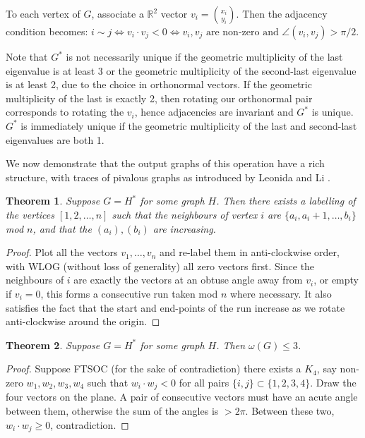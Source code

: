 \documentclass[11pt]{article}
\newtheorem{thm}{Theorem}[section]
\begin{document}
To each vertex of $G$, associate a $\mathbb{R}^2$ vector $v_i = \binom{x_i}{y_i}$. Then the adjacency condition becomes: $i \sim j \iff v_i \cdot v_j < 0 \iff v_i, v_j \text{ are non-zero and } \angle (v_i, v_j) > \pi/2$.

Note that $G^*$ is not necessarily unique if the geometric multiplicity of the last eigenvalue is at least 3 or the geometric multiplicity of the second-last eigenvalue is at least 2, due to the choice in orthonormal vectors. If the geometric multiplicity of the last is exactly 2, then rotating our orthonormal pair corresponds to rotating the $v_i$, hence adjacencies are invariant and $G^*$ is unique. $G^*$ is immediately unique if the geometric multiplicity of the last and second-last eigenvalues are both 1. 

We now demonstrate that the output graphs of this operation have a rich structure, with traces of pivalous graphs as introduced by Leonida and Li \cite{leonida2024structure}. 

\begin{thm}\label{thm:operation-run}
    Suppose $G = H^*$ for some graph $H$. Then there exists a labelling of the vertices $[1, 2, \dots, n]$ such that the neighbours of vertex $i$ are $\{a_i, a_i+1, \dots, b_i\}$ mod $n$, and that the $(a_i), (b_i)$ are increasing. 
\end{thm}
\begin{proof}    
    Plot all the vectors $v_1, \dots, v_n$ and re-label them in anti-clockwise order, with WLOG (without loss of generality) all zero vectors first. Since the neighbours of $i$ are exactly the vectors at an obtuse angle away from $v_i$, or empty if $v_i = 0$, this forms a consecutive run taken mod $n$ where necessary. It also satisfies the fact that the start and end-points of the run increase as we rotate anti-clockwise around the origin.
\end{proof}

\begin{thm}\label{thm:operation-clique}
    Suppose $G = H^*$ for some graph $H$. Then $\omega(G) \le 3$. 
\end{thm}
\begin{proof}
    Suppose FTSOC (for the sake of contradiction) there exists a $K_4$, say non-zero $w_1, w_2, w_3, w_4$ such that $w_i \cdot w_j < 0$ for all pairs $\{i, j\} \subset \{1, 2, 3, 4\}$. Draw the four vectors on the plane. A pair of consecutive vectors must have an acute angle between them, otherwise the sum of the angles is $> 2\pi$. Between these two, $w_i \cdot w_j \ge 0$, contradiction.
\end{proof}
\end{document}
